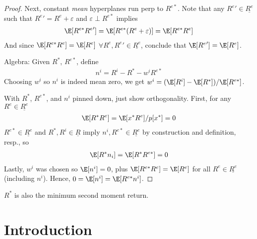 \documentclass[12pt]{article}
\theoremstyle{plain}
\theoremstyle{definition}
\theoremstyle{remark}
\begin{document}
\begin{multicols*}{2}
\begin{proof}
Next, constant \emph{mean} hyperplanes run perp to $R^{e*}$.
Note that any ${R^{e}}'\in\underline{R^e}$ such that
${R^{e}}'=R^e+\varepsilon$ and $\varepsilon\perp R^{e*}$
implies
\begin{align*}
  \E[R^{e*}{R^{e}}']
  =
  \E[R^{e*}(R^{e}+\varepsilon)]
  = \E[R^{e*}R^e]
\end{align*}
And since $\E[R^{e*}R^e]=\E[R^e]$
$\forall R^e,{R^e}'\in\underline{R^e}$, conclude that
$\E[{R^{e}}']=\E[R^{e}]$.

Algebra:
Given $R^*$, $R^{e*}$, define
\begin{align*}
  n^i = R^i - R^* -w^i R^{e*}
\end{align*}
Choosing $w^i$ so $n^i$ is indeed mean zero, we get
$w^i = (\E[R^i] - \E[R^*])/\E[R^{e*}]$.

With $R^*$, $R^{e*}$, and $n^i$ pinned down, just show orthogonality.
First, for any $R^e\in\underline{R^e}$
\begin{align*}
  \E[R^*R^e]=\E[x^*R^e]/p[x^*]=0
\end{align*}
$R^{e*}\in\underline{R^e}$ and $R^*,R^i\in\underline{R}$
imply $n^i,R^{e*}\in\underline{R^e}$ by construction and definition,
resp., so
\begin{align*}
  \E[R^*n_i]=\E[R^*R^{e*}]=0
\end{align*}
Lastly, $w^i$ was chosen so $\E[n^i]=0$, plus
$\E[R^{e*}R^e]=\E[R^e]$ for all $R^e\in\underline{R^e}$ (including
$n^i$). Hence, $0=\E[n^i] =\E[R^{e*}n^i]$.
\end{proof}

\clearpage
$R^*$ is also the minimum second moment return.

\end{multicols*}

\newpage
\section{Introduction}
\end{document}
